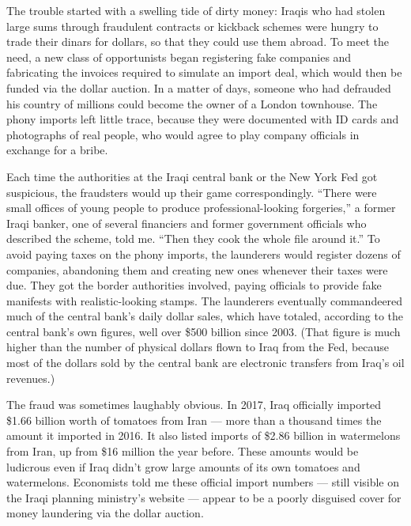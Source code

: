 The trouble started with a swelling tide of dirty money: Iraqis who had
stolen large sums through fraudulent contracts or kickback schemes were
hungry to trade their dinars for dollars, so that they could use them
abroad. To meet the need, a new class of opportunists began registering
fake companies and fabricating the invoices required to simulate an
import deal, which would then be funded via the dollar auction. In a
matter of days, someone who had defrauded his country of millions could
become the owner of a London townhouse. The phony imports left little
trace, because they were documented with ID cards and photographs of
real people, who would agree to play company officials in exchange for a
bribe.

Each time the authorities at the Iraqi central bank or the New York Fed
got suspicious, the fraudsters would up their game correspondingly.
``There were small offices of young people to produce
professional-looking forgeries,'' a former Iraqi banker, one of several
financiers and former government officials who described the scheme,
told me. ``Then they cook the whole file around it.'' To avoid paying
taxes on the phony imports, the launderers would register dozens of
companies, abandoning them and creating new ones whenever their taxes
were due. They got the border authorities involved, paying officials to
provide fake manifests with realistic-looking stamps. The launderers
eventually commandeered much of the central bank's daily dollar sales,
which have totaled, according to the central bank's own figures, well
over \$500 billion since 2003. (That figure is much higher than the
number of physical dollars flown to Iraq from the Fed, because most of
the dollars sold by the central bank are electronic transfers from
Iraq's oil revenues.)

The fraud was sometimes laughably obvious. In 2017, Iraq officially
imported \$1.66 billion worth of tomatoes from Iran --- more than a
thousand times the amount it imported in 2016. It also listed imports of
\$2.86 billion in watermelons from Iran, up from \$16 million the year
before. These amounts would be ludicrous even if Iraq didn't grow large
amounts of its own tomatoes and watermelons. Economists told me these
official import numbers --- still visible on the Iraqi planning
ministry's website --- appear to be a poorly disguised cover for money
laundering via the dollar auction.

